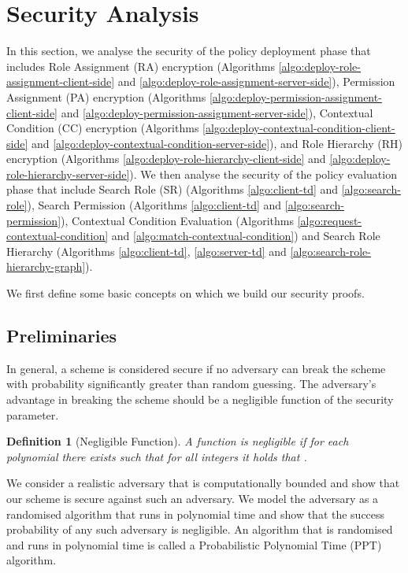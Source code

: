 \documentclass[final,5p,times,twocolumn]{elsarticle}
\newtheorem{definition}{Definition}
\begin{document}
\section{Security Analysis}
\label{sec:security-analysis} 
In this section, we analyse the security of the policy deployment phase that includes Role Assignment (RA) encryption (Algorithms \ref{algo:deploy-role-assignment-client-side} and \ref{algo:deploy-role-assignment-server-side}), Permission Assignment (PA) encryption (Algorithms \ref{algo:deploy-permission-assignment-client-side} and \ref{algo:deploy-permission-assignment-server-side}), Contextual Condition (CC) encryption (Algorithms \ref{algo:deploy-contextual-condition-client-side} and \ref{algo:deploy-contextual-condition-server-side}), and Role Hierarchy (RH) encryption (Algorithms \ref{algo:deploy-role-hierarchy-client-side} and \ref{algo:deploy-role-hierarchy-server-side}). We then analyse the security of the policy evaluation phase that include Search Role (SR) (Algorithms \ref{algo:client-td} and \ref{algo:search-role}), Search Permission (Algorithms \ref{algo:client-td} and \ref{algo:search-permission}), Contextual Condition Evaluation (Algorithms \ref{algo:request-contextual-condition} and \ref{algo:match-contextual-condition}) and Search Role Hierarchy (Algorithms \ref{algo:client-td}, \ref{algo:server-td} and \ref{algo:search-role-hierarchy-graph}). 

We first define some basic concepts on which we build our security proofs.

\subsection{Preliminaries}
In general, a scheme is considered secure if no adversary can break the scheme with probability significantly greater than random guessing. The adversary's advantage in breaking the scheme should be a negligible function of the security parameter.

\begin{definition}[Negligible Function]
A function  is negligible if for each polynomial  there exists  such that for all integers  it holds that .
\end{definition}

We consider a realistic adversary that is computationally bounded and show that our scheme is secure against such an adversary. We model the adversary as a randomised algorithm that runs in polynomial time and show that the success probability of any such adversary is negligible. An algorithm that is randomised and runs in polynomial time is
called a Probabilistic Polynomial Time (PPT) algorithm.
\end{document}
